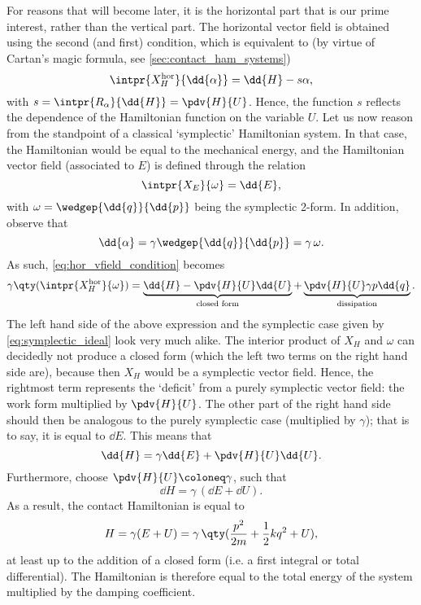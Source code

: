 For reasons that will become later, it is the horizontal part that is our prime interest, rather than the vertical part. The horizontal vector field is obtained using the second (and first) condition, which is equivalent to (by virtue of Cartan's magic formula, see \cref{sec:contact_ham_systems})
\begin{equation}
    \intpr{X_H^\text{hor}}{\dd{\alpha}} = \dd{H} - s \alpha, 
    \label{eq:hor_vfield_condition}
\end{equation}
with $s = \intpr{R_\alpha}{\dd{H}} = \pdv{H}{U}$. Hence, the function $s$ reflects the dependence of the Hamiltonian function on the variable $U$. Let us now reason from the standpoint of a classical `symplectic' Hamiltonian system. In that case, the Hamiltonian would be equal to the mechanical energy, and the Hamiltonian vector field (associated to $E$) is defined through the relation
\begin{equation}
    \intpr{X_E}{\omega} = \dd{E}, 
    \label{eq:symplectic_ideal}
\end{equation}
with $\omega = \wedgep{\dd{q}}{\dd{p}}$ being the symplectic 2-form. In addition, observe that 
$$
    \dd{\alpha} = \gamma \wedgep{\dd{q}}{\dd{p}} = \gamma\,\omega. 
$$
As such, \cref{eq:hor_vfield_condition} becomes
$$
    \gamma \qty( \intpr{X_H^\text{hor}}{\omega} ) = \underbrace{\dd{H} - \pdv{H}{U}\dd{U}}_\text{closed form} + \underbrace{\pdv{H}{U} \gamma p\dd{q}}_\text{dissipation}.
$$
The left hand side of the above expression and the symplectic case given by \cref{eq:symplectic_ideal} look very much alike. The interior product of $X_H$ and $\omega$ can decidedly not produce a closed form (which the left two terms on the right hand side are), because then $X_H$ would be a symplectic vector field. Hence, the rightmost term represents the `deficit' from a purely symplectic vector field: the work form multiplied by $\pdv{H}{U}$. The other part of the right hand side should then be analogous to the purely symplectic case (multiplied by $\gamma$); that is to say, it is equal to $\dd{E}$. This means that 
$$ \dd{H}  = \gamma \dd{E} + \pdv{H}{U}\dd{U}. $$
Furthermore, choose $ \displaystyle \pdv{H}{U} \coloneq \gamma $, such that
$$ \dd{H} = \gamma\,(\dd{E} + \dd{U}). $$
As a result, the contact Hamiltonian is equal to
\begin{equation}
    H = \gamma (E + U) = \gamma\,\qty(\frac{p^2}{2m} + \frac{1}{2}kq^2 + U), 
\end{equation}
at least up to the addition of a closed form (i.e. a first integral or total differential). The Hamiltonian is therefore equal to the total energy of the system multiplied by the damping coefficient. 

